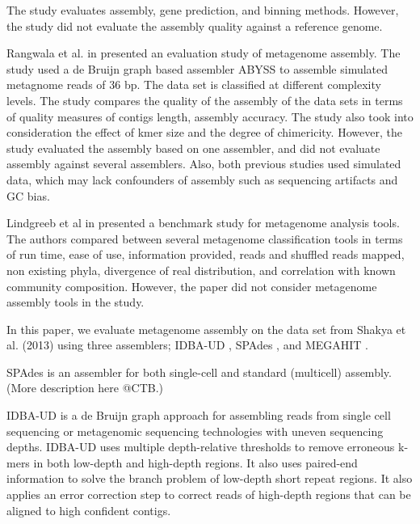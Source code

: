 \documentclass[10pt,a4paper,twocolumn]{article}
\begin{document}
The study evaluates assembly, gene prediction, and binning
methods. However, the study did not evaluate the assembly quality
against a reference genome.

Rangwala et al. in \cite{huzefa2011} presented an evaluation study of
metagenome assembly. The study used a de Bruijn graph based assembler
ABYSS \cite{abyss} to assemble simulated metagnome reads of 36 bp. The
data set is classified at different complexity levels.
The study compares the quality of the assembly of the data sets in
terms of quality measures of contigs length, assembly accuracy. The
study also took into consideration the effect of kmer size and the
degree of chimericity.  However, the study evaluated the assembly
based on one assembler, and did not evaluate assembly against several
assemblers.  Also, both previous studies used simulated data, which
may lack confounders of assembly such as sequencing artifacts and GC bias.
 
Lindgreeb et al in \cite{metaclass} presented a benchmark study for
metagenome analysis tools. The authors compared between several
metagenome classification tools in terms of run time, ease of use,
information provided, reads and shuffled reads mapped, non existing
phyla, divergence of real distribution, and correlation with known
community composition. However, the paper did not consider metagenome
assembly tools in the study.

 
In this paper, we evaluate metagenome assembly on the data set from
Shakya et al. (2013) using three assemblers; IDBA-UD \cite{idba},
SPAdes \cite {spades}, and MEGAHIT \cite{megahit}.

SPAdes \cite{spades} is an assembler for both single-cell and standard
(multicell) assembly. (More description here @CTB.)

IDBA-UD \cite{idba} is a de Bruijn graph
approach for assembling reads from single cell sequencing or
metagenomic sequencing technologies with uneven sequencing
depths. IDBA-UD uses multiple depth-relative thresholds to remove
erroneous k-mers in both low-depth and high-depth regions. It also
uses paired-end information to solve the branch problem of low-depth
short repeat regions. It also applies an error correction step to correct
reads of high-depth regions that can be aligned to high confident
contigs.
\end{document}
